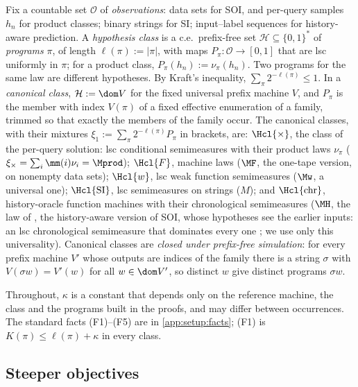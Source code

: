 \begin{definition}\label{def:setup:class}
Fix a countable set $\mathcal O$ of \emph{observations}: data sets for SOI, and per-query samples $h_n$ for product classes; binary strings for SI; input--label sequences for history-aware prediction. A \emph{hypothesis class} is a c.e.\ prefix-free set $\mathcal H\subseteq\{0,1\}^*$ of \emph{programs} $\pi$, of length $\ell(\pi):=|\pi|$, with maps $P_\pi:\mathcal O\to[0,1]$ that are lsc uniformly in $\pi$; for a product class, $P_\pi(h_n):=\nu_\pi(h_n)$. Two programs for the same law are different hypotheses. By Kraft's inequality, $\sum_\pi2^{-\ell(\pi)}\le1$.
In a \emph{canonical class}, $\mathcal H:=\dom V$ for the fixed universal prefix machine $V$, and $P_\pi$ is the member with index $V(\pi)$ of a fixed effective enumeration of a family, trimmed so that exactly the members of the family occur. The canonical classes, with their mixtures $\xi_1:=\sum_\pi2^{-\ell(\pi)}P_\pi$ in brackets, are: $\Hcl{\times}$, the class of the per-query solution: lsc conditional semimeasures with their product laws $\nu_\pi$ ($\xi_\times=\sum_i\mm(i)\nu_i=\Mprod$); $\Hcl{F}$, machine laws ($\MF$, the one-tape version, on nonempty data sets); $\Hcl{w}$, lsc weak function semimeasures ($\Mw$, a universal one); $\Hcl{\mathrm{SI}}$, lsc semimeasures on strings ($M$); and $\Hcl{\mathrm{chr}}$, history-oracle function machines with their chronological semimeasures ($\MH$, the law of \SFIhist{}, the history-aware version of SOI, whose hypotheses see the earlier inputs: an lsc chronological semimeasure that dominates every one \citep[Corollary~6.17(a)]{claudeSFI2026fundamentals}; we use only this universality). %
Canonical classes are \emph{closed under prefix-free simulation}: for every prefix machine $V'$ whose outputs are indices of the family there is a string $\sigma$ with $V(\sigma w)=V'(w)$ for all $w\in\dom V'$, so distinct $w$ give distinct programs $\sigma w$.
\end{definition}

Throughout, $\kappa$ is a constant that depends only on the reference machine, the class and the programs built in the proofs, and may differ between occurrences. The standard facts (F1)--(F5) are in \cref{app:setup:facts}; (F1) is $K(\pi)\le\ell(\pi)+\kappa$ in every class.

\subsection{Steeper objectives}\label{sec:setup:objectives}

